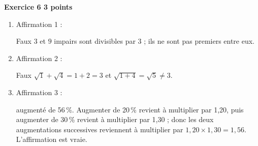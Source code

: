 \textbf{Exercice 6 \hfill 3 points}

\medskip

%

\begin{enumerate}
\item Affirmation 1 :

Faux $3$ et $9$ impairs sont divisibles par 3 ; ils ne sont pas premiers entre eux.
\item Affirmation 2 :

Faux $\sqrt{1} + \sqrt{4} = 1 + 2 = 3$ et $\sqrt{1 + 4} = \sqrt{5} \ne 3$.
\item Affirmation 3 :

augmenté de 56\,\%.
Augmenter de 20\,\% revient à multiplier par 1,20, puis augmenter de 30\,\% revient à multiplier par 1,30 ; donc les deux augmentations successives reviennent à multiplier par $1,20 \times 1,30 = 1,56$. L'affirmation est vraie.
\end{enumerate}

\bigskip

